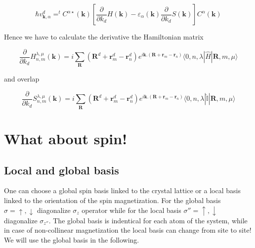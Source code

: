 \documentclass{article}
\newcommand{\bra}[1]{\langle #1|}
\newcommand{\ket}[1]{|#1\rangle}
\newcommand{\op}[1]{\hat{#1}}
\begin{document}
\[ \hbar v_{\mathbf{k},\alpha}^{d}= ^tC^{\alpha \star}(\mathbf{k}) \left [\frac{\partial}{\partial k_{d}} H(\mathbf{k})  -\varepsilon_{\alpha}(\mathbf{k}) \frac{\partial}{\partial k_{d}} S(\mathbf{k}) \right] C^{\alpha}(\mathbf{k})\]

 \noindent
 Hence we have to calculate the derivative the Hamiltonian matrix
 
\[\displaystyle \frac{\partial}{\partial k_{d}}H_{n,m}^{\lambda,\mu}(\mathbf{k})=
i \sum_{\mathbf{R}} (\mathbf{R}^{d}+\mathbf{r}_{m}^{d}-\mathbf{r}_n^{d})e^{i\mathbf{k}.(\mathbf{R}+\mathbf{r}_{m}-\mathbf{r}_n)} \bra{ 0,n,\lambda} \op{H} \ket{\mathbf{R},m,\mu}\]

\noindent and overlap

\[\displaystyle  \frac{\partial}{\partial k_{d}} S_{n,m}^{\lambda,\mu}(\mathbf{k})=
i\sum_{\mathbf{R}} (\mathbf{R}^{d}+\mathbf{r}_{m}^{d}-\mathbf{r}_n^{d})e^{i\mathbf{k}.(\mathbf{R}+\mathbf{r}_{m}-\mathbf{r}_n)}
\bra{ 0,n,\lambda}\op{\mathbb{I}}\ket{\mathbf{R},m,\mu }\]


\section{What about spin!}

\subsection{Local and global basis}

\noindent
One can choose a global spin basis linked to the crystal lattice or a local basis linked to the orientation of the spin magnetization. For the global basis
$\sigma=\uparrow, \downarrow$ diagonalize $\sigma_z$ operator while for the local basis $\sigma''=\uparrow, \downarrow$ diagonalize $\sigma_{z''}$.
The global basis is indentical for each atom of the system, while in case of non-collinear magnetization the local basis can change from site to site! We will use the global basis in the following.

\end{document}
